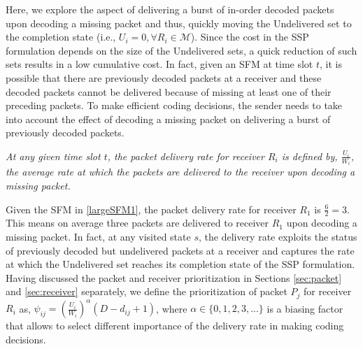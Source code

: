 \documentclass[12pt, peerreview, onecolumn]{IEEEtran}
\begin{document}
Here, we explore the aspect of  delivering a burst of in-order decoded packets upon decoding a missing packet and thus,  quickly moving the Undelivered set to the completion state (i.e., $U_i = 0, \forall R_i\in \mathcal{M}$). Since the cost in the SSP formulation depends on  the size of the Undelivered sets, a quick reduction of such sets results in  a low cumulative cost. In fact, given an SFM at  time slot $t$, it is possible that there are previously decoded packets at a receiver and these decoded packets cannot be delivered  because of missing at least one
of their preceding packets. To make efficient coding decisions, the sender  needs to take into account the effect of decoding  a missing packet on delivering  a burst of previously decoded packets. 

\begin{definitions}
\emph{At any given time slot $t$, the packet delivery rate for  receiver $R_i$ is defined by, $\frac{U_i}{W_i}$, the average rate at which the packets are  delivered to the receiver upon decoding a missing packet.\footnotemark}
\end{definitions}



Given the SFM in \eqref{largeSFM1}, the packet delivery rate for receiver $R_1$ is $\frac{6}{2} = 3$. This means  on average three packets are delivered to receiver $R_1$ upon decoding a missing packet.
In fact, at any visited state $s$, the delivery rate exploits the  status of previously decoded but undelivered  packets at a receiver and  captures the rate at which the Undelivered set reaches  its completion state of the SSP formulation. Having discussed the  packet and receiver prioritization in Sections \ref{sec:packet} and \ref{sec:receiver} separately, we define the prioritization of packet $P_j$ for receiver $R_i$ as,  $\psi_{ij} = (\frac{U_i}{W_i})^{\alpha}(D - d_{ij} +1)$, where $\alpha \in \{0,1,2,3,...\}$ is a biasing factor that  allows to select different importance of the delivery rate in making coding decisions.



\vspace{-5mm}
\end{document}
